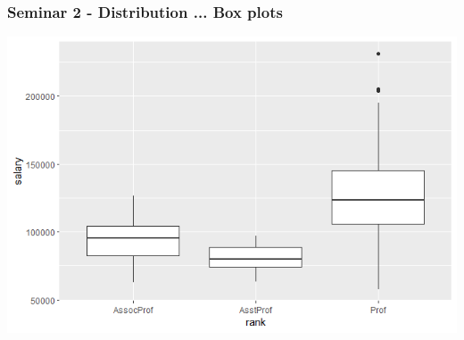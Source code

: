\documentclass{beamer}
\begin{document}
\begin{frame}
\frametitle{Seminar 2 - Distribution ... Box plots }

\begin{example} 
\includegraphics[width=0.8\linewidth]{Seminar_2_images/R/b boxplots.png}

\end{example}
\end{frame}
\end{document}
